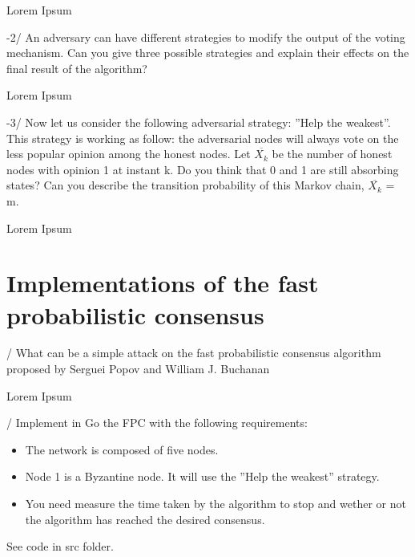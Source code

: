 \documentclass[11pt]{article}
\begin{document}
Lorem Ipsum

\vspace{5mm}

-2/ An adversary can have different strategies to modify the output of the voting mechanism. Can
you give three possible strategies and explain their effects on the final result of the algorithm?

\vspace{5mm}

Lorem Ipsum

\vspace{5mm}

-3/ Now let us consider the following adversarial strategy: ”Help the weakest”. This strategy is
working as follow: the adversarial nodes will always vote on the less popular opinion among
the honest nodes. Let $\overline{X_{k}}$ be the number of honest nodes with opinion 1 at instant k. Do you
think that 0 and 1 are still absorbing states? Can you describe the transition probability of this
Markov chain, $\overline{X_{k}}$ = m.

\vspace{5mm}

Lorem Ipsum

\vspace{10mm}

\section{Implementations of the fast probabilistic consensus}

\vspace{5mm}

/ What can be a simple attack on the fast probabilistic consensus algorithm proposed
by Serguei Popov and William J. Buchanan

\vspace{5mm}

Lorem Ipsum

\vspace{5mm}

/ Implement in Go the FPC with the following requirements:
\begin{itemize}
    \item The network is composed of five nodes.
    \item Node 1 is a Byzantine node. It will use the ”Help the weakest” strategy.
    \item You need measure the time taken by the algorithm to stop and wether or not the algorithm has
    reached the desired consensus.
\end{itemize}

\vspace{5mm}

\noindent See code in src folder.



\end{document}
